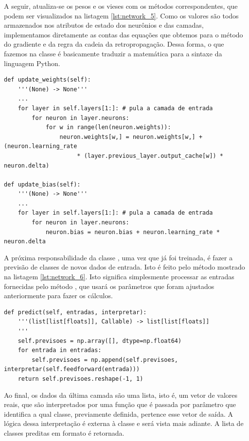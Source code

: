 A seguir, atualiza-se os pesos e os vieses com os métodos correspondentes, que podem ser visualizados na listagem \ref{lst:network_5}. Como os valores são todos armazenados nos atributos de estado dos neurônios e das camadas, implementamos diretamente as contas das equações que obtemos para o método do gradiente e da regra da cadeia da retropropagação. Dessa forma, o que fazemos na classe  é basicamente traduzir a matemática para a sintaxe da linguagem Python.
\newline
\estiloR
\begin{lstlisting}[caption={Trecho da classe \eng{Network}}, label={lst:network_5}, escapeinside={\%}]
def update_weights(self):
    '''(None) -> None'''
    ...
    for layer in self.layers[1:]: # pula a camada de entrada
        for neuron in layer.neurons:
            for w in range(len(neuron.weights)):
                neuron.weights[w,] = neuron.weights[w,] + (neuron.learning_rate
                     * (layer.previous_layer.output_cache[w]) * neuron.delta)

def update_bias(self):
    '''(None) -> None'''
    ...
    for layer in self.layers[1:]: # pula a camada de entrada
        for neuron in layer.neurons:
            neuron.bias = neuron.bias + neuron.learning_rate * neuron.delta
\end{lstlisting}


A próxima responsabilidade da classe , uma vez que já foi treinada, é fazer a previsão de classes de novos dados de entrada. Isto é feito pelo método mostrado na listagem \ref{lst:network_6}. Isto significa simplesmente processar as entradas fornecidas pelo método , que usará os parâmetros que foram ajustados anteriormente para fazer os cálculos. 
\newline
\estiloR
\begin{lstlisting}[caption={Trecho da classe \eng{Network}}, label={lst:network_6}, escapeinside={\%}]
def predict(self, entradas, interpretar):
    '''(list[list[floats]], Callable) -> list[list[floats]]
    '''
    self.previsoes = np.array([], dtype=np.float64)
    for entrada in entradas:
        self.previsoes = np.append(self.previsoes, interpretar(self.feedforward(entrada)))
    return self.previsoes.reshape(-1, 1)
\end{lstlisting}


Ao final, os dados da última camada são uma lista, isto é, um vetor de valores reais, que são interpretados por uma função que é passada por parâmetro que identifica a qual classe, previamente definida, pertence esse vetor de saída. A lógica dessa interpretação é externa à classe  e será vista mais adiante. A lista de classes preditas em formato  é retornada.

